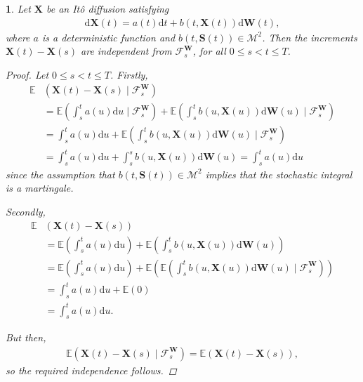\documentclass[english]{article}
\numberwithin{equation}{section}
\numberwithin{figure}{section}
\theoremstyle{bolddescit}
\theoremstyle{definition}
\theoremstyle{definition}
\theoremstyle{plain}
\newtheorem{lemma}[theorem]{\protect\lemmaname}
\theoremstyle{plain}
\theoremstyle{bolddesc}
\theoremstyle{plain}
\theoremstyle{remark}
\providecommand{\lemmaname}{Lemma}
\begin{document}
\begin{lemma}\label{lem:fp-ito-diffusion-indep-increments}
  Let $\mathbf{X}$ be an It\^o diffusion satisfying
  \begin{align}\label{eq:fp-ito-diffusion-deterministic-drift}
    \mathrm{d}\mathbf{X}(t) = a(t) \mathrm{d}t + b(t,\mathbf{X}(t)) \mathrm{d}\mathbf{W}(t),
  \end{align}
  where $a$ is a deterministic function and $b(t,\mathbf{S}(t)) \in \mathcal{M}^2$. Then the increments $\mathbf{X}(t) - \mathbf{X}(s)$ are independent from $\mathcal{F}^\mathbf{W}_s$, for all $0 \le s < t \le T$.

  \begin{proof}
    Let $0 \le s < t \le T$. Firstly,
    \begin{align*}
      \mathbb{E}&(\mathbf{X}(t) - \mathbf{X}(s) \mid \mathcal{F}^\mathbf{W}_s)\\
      &= \mathbb{E}\left(\int_s^t a(u) \mathrm{d}u \mid \mathcal{F}^\mathbf{W}_s\right) + \mathbb{E}\left(\int_s^t b(u,\mathbf{X}(u)) \mathrm{d}\mathbf{W}(u) \mid \mathcal{F}^\mathbf{W}_s\right)\\
      &= \int_s^t a(u) \mathrm{d}u + \mathbb{E}\left(\int_s^t b(u,\mathbf{X}(u)) \mathrm{d}\mathbf{W}(u) \mid \mathcal{F}^\mathbf{W}_s\right) \tag{$a$ deterministic}\\
      &= \int_s^t a(u) \mathrm{d}u + \int_s^s b(u,\mathbf{X}(u)) \mathrm{d}\mathbf{W}(u)
      = \int_s^t a(u) \mathrm{d}u
    \end{align*}
    since the assumption that $b(t,\mathbf{S}(t)) \in \mathcal{M}^2$ implies that the stochastic integral is a martingale.

    Secondly,
    \begin{align*}
      \mathbb{E}&(\mathbf{X}(t) - \mathbf{X}(s))\\
      &= \mathbb{E}\left(\int_s^t a(u) \mathrm{d}u\right) + \mathbb{E}\left(\int_s^t b(u,\mathbf{X}(u)) \mathrm{d}\mathbf{W}(u)\right)\\
      &= \mathbb{E}\left(\int_s^t a(u) \mathrm{d}u\right) + \mathbb{E}\left(\mathbb{E}\left(\int_s^t b(u,\mathbf{X}(u)) \mathrm{d}\mathbf{W}(u) \mid \mathcal{F}^\mathbf{W}_s\right)\right) \tag{tower property}\\
      &= \int_s^t a(u) \mathrm{d}u + \mathbb{E}\left(0\right) \tag{as before}\\
      &= \int_s^t a(u) \mathrm{d}u.
    \end{align*}

    But then,
    \begin{align*}
      \mathbb{E}(\mathbf{X}(t) - \mathbf{X}(s) \mid \mathcal{F}^\mathbf{W}_s)
      = \mathbb{E}(\mathbf{X}(t) - \mathbf{X}(s)),
    \end{align*}
    so the required independence follows.
  \end{proof}
\end{lemma}
\end{document}
